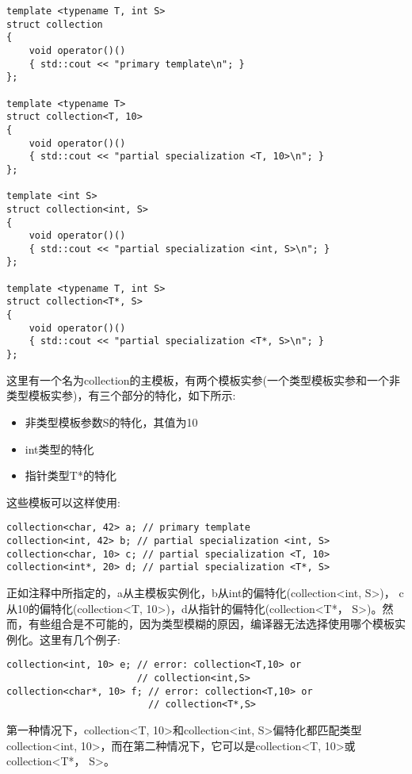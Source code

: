 \begin{lstlisting}[style=styleCXX]
template <typename T, int S>
struct collection
{
	void operator()()
	{ std::cout << "primary template\n"; }
};

template <typename T>
struct collection<T, 10>
{
	void operator()()
	{ std::cout << "partial specialization <T, 10>\n"; }
};

template <int S>
struct collection<int, S>
{
	void operator()()
	{ std::cout << "partial specialization <int, S>\n"; }
};

template <typename T, int S>
struct collection<T*, S>
{
	void operator()()
	{ std::cout << "partial specialization <T*, S>\n"; }
};
\end{lstlisting}

这里有一个名为collection的主模板，有两个模板实参(一个类型模板实参和一个非类型模板实参)，有三个部分的特化，如下所示:

\begin{itemize}
\item 
非类型模板参数S的特化，其值为10

\item 
int类型的特化

\item 
指针类型T*的特化
\end{itemize}

这些模板可以这样使用:

\begin{lstlisting}[style=styleCXX]
collection<char, 42> a; // primary template
collection<int, 42> b; // partial specialization <int, S>
collection<char, 10> c; // partial specialization <T, 10>
collection<int*, 20> d; // partial specialization <T*, S>
\end{lstlisting}

正如注释中所指定的，a从主模板实例化，b从int的偏特化(collection<int, S>)， c从10的偏特化(collection<T, 10>)，d从指针的偏特化(collection<T*， S>)。然而，有些组合是不可能的，因为类型模糊的原因，编译器无法选择使用哪个模板实例化。这里有几个例子:

\begin{lstlisting}[style=styleCXX]
collection<int, 10> e; // error: collection<T,10> or
                       // collection<int,S>
collection<char*, 10> f; // error: collection<T,10> or
                         // collection<T*,S>
\end{lstlisting}

第一种情况下，collection<T, 10>和collection<int, S>偏特化都匹配类型collection<int, 10>，而在第二种情况下，它可以是collection<T, 10>或collection<T*， S>。

